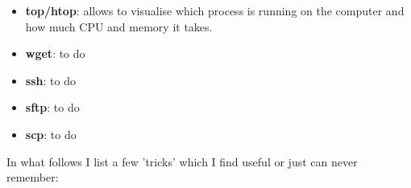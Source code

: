 \begin{itemize}
\item {\color{teal} \bf top/htop}: allows to visualise which process is running on the computer and how much CPU and memory it takes.




\item {\color{teal} \bf wget}: to do 
\item {\color{teal} \bf ssh}:   to do 
\item {\color{teal} \bf sftp}:   to do 
\item {\color{teal} \bf scp}:   to do 



\end{itemize} 


\vspace{1cm}

In what follows I list a few 'tricks' which I find useful or just can never remember:

